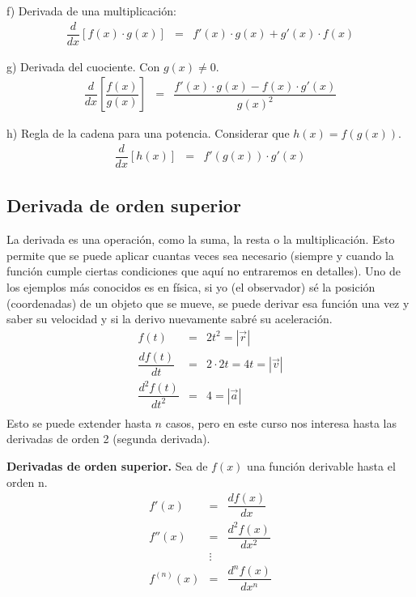 \noindent f) Derivada de una multiplicación:\\
\begin{eqnarray}
\dfrac{d}{dx}\left[f(x)\cdot g(x) \right]&=& f'(x)\cdot g(x)+g'(x)\cdot f(x)
\end{eqnarray}

\noindent g) Derivada del cuociente. Con $g(x)\neq 0$.\\
\begin{eqnarray}
\dfrac{d}{dx}\left[\dfrac{f(x)}{g(x)}\right]&=& \dfrac{f'(x)\cdot g(x)-f(x)\cdot g'(x)}{g(x)^{2}}
\end{eqnarray}

\noindent h) Regla de la cadena para una potencia. Considerar que $h(x)=f(g(x))$.\\
\begin{eqnarray}
\dfrac{d}{dx}\left[h(x)\right]&=& f'(g(x))\cdot g'(x)
\end{eqnarray}

\subsection{Derivada de orden superior}

La derivada es una operación, como la suma, la resta o la multiplicación. Esto permite que se puede aplicar cuantas veces sea necesario (siempre y cuando la función cumple ciertas condiciones que aquí no entraremos en detalles). Uno de los ejemplos más conocidos es en física, si yo (el observador) sé la posición (coordenadas) de un objeto que se mueve, se puede derivar esa función una vez y saber su velocidad y si la derivo nuevamente sabré su aceleración.
\begin{eqnarray*}
f(t)&=& 2t^{2}=|\vec{r}|\\
\dfrac{df(t)}{dt}&=&2\cdot 2t=4t=|\vec{v}|\\
\dfrac{d^{2}f(t)}{dt^{2}}&=&4= |\vec{a}|\\
\end{eqnarray*} 
Esto se puede extender hasta $n$ casos, pero en este curso nos interesa hasta las derivadas de orden 2 (segunda derivada).

\begin{mydef}
\textbf{Derivadas de orden superior. } Sea de $f(x)$ una función derivable hasta el orden n. 
\begin{eqnarray}
f'(x)&=&\dfrac{df(x)}{dx}\\
f''(x)&=&\dfrac{d^{2}f(x)}{dx^{2}}\\
&\vdots  &\nonumber\\
f^{(n)}(x)&=&\dfrac{d^{n}f(x)}{dx^{n}}
\end{eqnarray}
\end{mydef}

